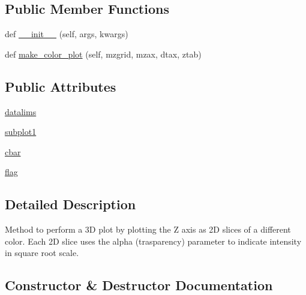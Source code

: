 \subsection*{Public Member Functions}
\begin{DoxyCompactItemize}
\item 
def \hyperlink{class_uni_dec_1_1unidec__modules_1_1_color_plot_1_1_color_plot2_d_aca0a8f7969dcb4fdca4ac0cacc33abb2}{\+\_\+\+\_\+init\+\_\+\+\_\+} (self, args, kwargs)
\item 
def \hyperlink{class_uni_dec_1_1unidec__modules_1_1_color_plot_1_1_color_plot2_d_a5650481cecdb043b51ac4b480e9e76df}{make\+\_\+color\+\_\+plot} (self, mzgrid, mzax, dtax, ztab)
\end{DoxyCompactItemize}
\subsection*{Public Attributes}
\begin{DoxyCompactItemize}
\item 
\hyperlink{class_uni_dec_1_1unidec__modules_1_1_color_plot_1_1_color_plot2_d_a66382e3fd49a057200b557def507ab7e}{datalims}
\item 
\hyperlink{class_uni_dec_1_1unidec__modules_1_1_color_plot_1_1_color_plot2_d_a4b77874dba36d3993a9982eaaee8b2a6}{subplot1}
\item 
\hyperlink{class_uni_dec_1_1unidec__modules_1_1_color_plot_1_1_color_plot2_d_a975cdd0424ec754bfbec10000db509bf}{cbar}
\item 
\hyperlink{class_uni_dec_1_1unidec__modules_1_1_color_plot_1_1_color_plot2_d_a6b5570a383c51b350d734c1584b0d361}{flag}
\end{DoxyCompactItemize}


\subsection{Detailed Description}
\begin{DoxyVerb}Method to perform a 3D plot by plotting the Z axis as 2D slices of a different color.
Each 2D slice uses the alpha (trasparency) parameter to indicate intensity in square root scale.
\end{DoxyVerb}
 

\subsection{Constructor \& Destructor Documentation}
\hypertarget{class_uni_dec_1_1unidec__modules_1_1_color_plot_1_1_color_plot2_d_aca0a8f7969dcb4fdca4ac0cacc33abb2}{}
